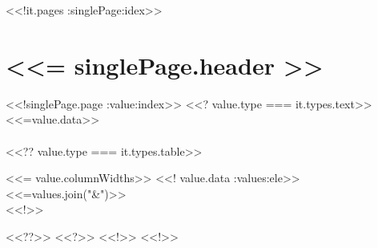 \documentclass{article}
\begin{document}
        <<!it.pages :singlePage:idex>>
            \newpage
            \section{<<= singlePage.header >>}
                <<!singlePage.page :value:index>>
                    <<? value.type === it.types.text>>
                        <<=value.data>>\\\\
                    <<?? value.type === it.types.table>>
                        \begin{longtable}[l]{<<= value.columnWidths>>}\hline
                            <<! value.data :values:ele>>
                                <<=values.join("&")>>\\\hline
                            <<!>>
                        \end{longtable}
                    <<??>>
                    <<?>>
                <<!>>
        <<!>>
        
\end{document}
